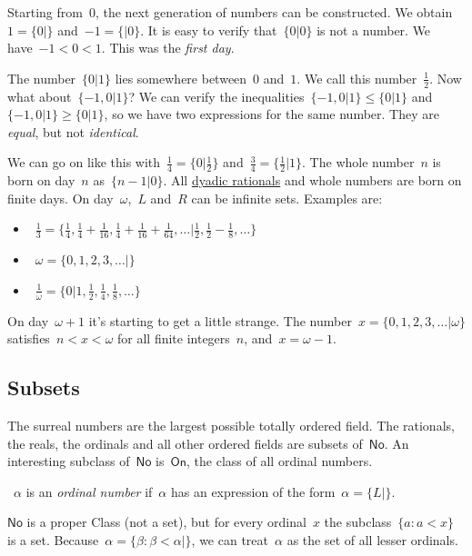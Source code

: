 Starting from~$0$, the next generation of numbers can be constructed. We obtain~$1 = \{ 0 \vert \}$ and~$-1 = \{ \vert 0 \}$. It is easy to verify that~$\{ 0 \vert 0 \}$ is not a number. We have~$-1 < 0 < 1$. This was the \emph{first day}.

The number~$\{ 0 \vert 1 \}$ lies somewhere between~$0$ and~$1$. We call this number~$\frac{1}{2}$. Now what about~$\{ -1, 0 \vert 1 \}$? We can verify the inequalities~$\{ -1, 0 \vert 1 \} \leq \{ 0 \vert 1 \}$ and~$\{ -1, 0 \vert 1 \} \geq \{ 0 \vert 1 \}$, so we have two expressions for the same number. They are \emph{equal}, but not \emph{identical}.

We can go on like this with~$\frac{1}{4} = \{ 0 \vert \frac{1}{2} \}$ and~$\frac{3}{4} = \{ \frac{1}{2} \vert 1 \}$. The whole number~$n$ is born on day~$n$ as~$\{ n-1 \vert 0 \}$. All \href{http://en.wikipedia.org/wiki/Dyadic_rational}{dyadic rationals} and whole numbers are born on finite days. On day~$\omega$,~$L$ and~$R$ can be infinite sets. Examples are:
\begin{itemize}
  \item~$\frac{1}{3} = \{ \frac{1}{4}, \frac{1}{4} + \frac{1}{16}, \frac{1}{4} + \frac{1}{16} + \frac{1}{64}, \ldots \vert \frac{1}{2}, \frac{1}{2} - \frac{1}{8}, \ldots \}$
  \item~$\omega = \{ 0, 1, 2, 3, \ldots \vert \}$
  \item~$\frac{1}{\omega} = \{ 0 \vert 1, \frac{1}{2}, \frac{1}{4}, \frac{1}{8}, \ldots \}$
\end{itemize}
On day~$\omega + 1$ it's starting to get a little strange. The number~$x = \{ 0, 1, 2, 3, \ldots \vert \omega \}$ satisfies~$n < x < \omega$ for all finite integers~$n$, and~$x = \omega - 1$.

\subsection{Subsets}
The surreal numbers are the largest possible totally ordered field. The rationals, the reals, the ordinals and all other ordered fields are subsets of~$\textsf{No}$. An interesting subclass of~$\textsf{No}$ is~$\textsf{On}$, the class of all ordinal numbers.

\begin{definition}
 ~$\alpha$ is an \emph{ordinal number} if~$\alpha$ has an expression of the form~$\alpha = \{L\vert \}$.
\end{definition}

$\textsf{No}$ is a proper Class (not a set), but for every ordinal~$x$ the subclass~$\{ a : a < x \}$ is a set. Because~$\alpha = \{ \beta : \beta < \alpha \vert \}$, we can treat~$\alpha$ as the set of all lesser ordinals.
